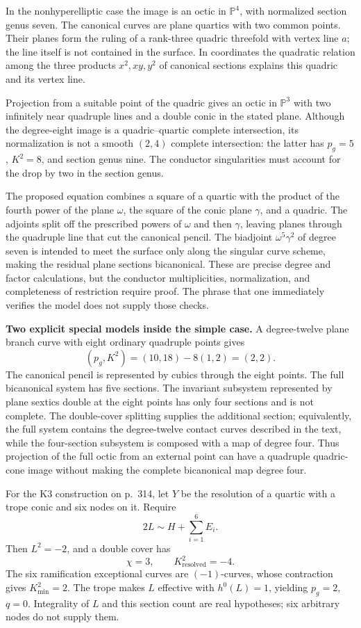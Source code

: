 In the nonhyperelliptic case the image is an octic in \(\mathbb P^4\), with normalized section genus seven. The canonical curves are plane quartics with two common points. Their planes form the ruling of a rank-three quadric threefold with vertex line \(a\); the line itself is not contained in the surface. In coordinates the quadratic relation among the three products \(x^2,xy,y^2\) of canonical sections explains this quadric and its vertex line.

Projection from a suitable point of the quadric gives an octic in \(\mathbb P^3\) with two infinitely near quadruple lines and a double conic in the stated plane. Although the degree-eight image is a quadric--quartic complete intersection, its normalization is not a smooth \((2,4)\) complete intersection: the latter has \(p_g=5\), \(K^2=8\), and section genus nine. The conductor singularities must account for the drop by two in the section genus.

The proposed equation combines a square of a quartic with the product of the fourth power of the plane \(\omega\), the square of the conic plane \(\gamma\), and a quadric. The adjoints split off the prescribed powers of \(\omega\) and then \(\gamma\), leaving planes through the quadruple line that cut the canonical pencil. The biadjoint \(\omega^5\gamma^2\) of degree seven is intended to meet the surface only along the singular curve scheme, making the residual plane sections bicanonical. These are precise degree and factor calculations, but the conductor multiplicities, normalization, and completeness of restriction require proof. The phrase that one immediately verifies the model does not supply those checks.

\textbf{Two explicit special models inside the simple case.}
A degree-twelve plane branch curve with eight ordinary quadruple points gives
\[
(p_g,K^2)=(10,18)-8(1,2)=(2,2).
\]
The canonical pencil is represented by cubics through the eight points. The full bicanonical system has five sections. The invariant subsystem represented by plane sextics double at the eight points has only four sections and is not complete. The double-cover splitting supplies the additional section; equivalently, the full system contains the degree-twelve contact curves described in the text, while the four-section subsystem is composed with a map of degree four. Thus projection of the full octic from an external point can have a quadruple quadric-cone image without making the complete bicanonical map degree four.

For the K3 construction on p.~314, let \(Y\) be the resolution of a quartic with a trope conic and six nodes on it. Require
\[
2L\sim H+\sum_{i=1}^6E_i.
\]
Then \(L^2=-2\), and a double cover has
\[
\chi=3,\qquad K_{\mathrm{resolved}}^2=-4.
\]
The six ramification exceptional curves are \((-1)\)-curves, whose contraction gives \(K_{\min}^2=2\). The trope makes \(L\) effective with \(h^0(L)=1\), yielding \(p_g=2\), \(q=0\). Integrality of \(L\) and this section count are real hypotheses; six arbitrary nodes do not supply them.

